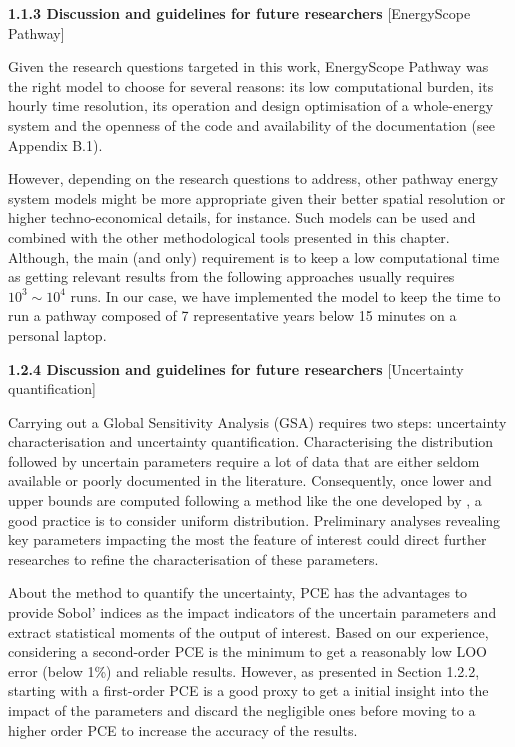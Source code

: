 \documentclass[12pt,a4paper]{article}
\begin{document}
\begin{mdframed}[style=manuscript]
\textbf{1.1.3 Discussion and guidelines for future researchers} [EnergyScope Pathway]

Given the research questions targeted in this work, EnergyScope Pathway was the right model to choose for several reasons: its low computational burden, its hourly time resolution, its operation and design optimisation of a whole-energy system and the openness of the code and availability of the documentation (see Appendix B.1). 

However, depending on the research questions to address, other pathway energy system models might be more appropriate given their better spatial resolution or higher techno-economical details, for instance. Such models can be used and combined with the other methodological tools presented in this chapter. Although, the main (and only) requirement is to keep a low computational time as getting relevant results from the following approaches usually requires $10^3\sim 10^4$ runs.  In our case, we have implemented the model to keep the time to run a pathway composed of 7 representative years below 15 minutes on a personal laptop.
\end{mdframed}

\begin{mdframed}[style=manuscript]
\textbf{1.2.4 Discussion and guidelines for future researchers} [Uncertainty quantification]

Carrying out a Global Sensitivity Analysis (GSA) requires two steps: uncertainty characterisation and uncertainty quantification. Characterising the distribution followed by uncertain parameters require a lot of data that are either seldom available or poorly documented in the literature. Consequently, once lower and upper bounds are computed following a method like the one developed by \citet{Moret2017}, a good practice is to consider uniform distribution. Preliminary analyses revealing key parameters impacting the most the feature of interest could direct further researches to refine the characterisation of these parameters.

About the method to quantify the uncertainty, PCE has the advantages to provide Sobol' indices as the impact indicators of the uncertain parameters and extract statistical moments of the output of interest. Based on our experience, considering a second-order PCE is the minimum to get a reasonably low LOO error (below 1\%) and reliable results. However, as presented in Section 1.2.2, starting with a first-order PCE is a good proxy to get a initial insight into the impact of the parameters and discard the negligible ones before moving to a higher order PCE to increase the accuracy of the results.
\end{mdframed}
\end{document}
